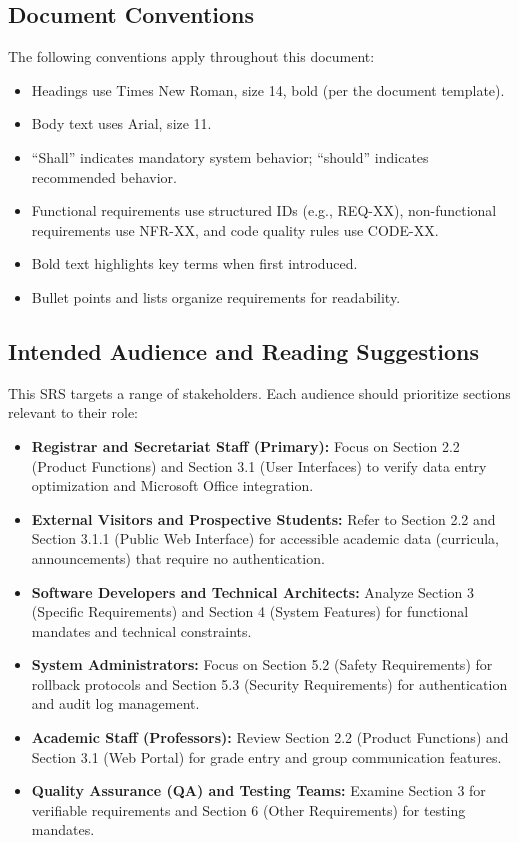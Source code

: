 \documentclass[11pt, a4paper]{article}
\begin{document}
\subsection{Document Conventions}
The following conventions apply throughout this document:
\begin{itemize}
    \item Headings use Times New Roman, size 14, bold (per the document template).
    \item Body text uses Arial, size 11.
    \item ``Shall'' indicates mandatory system behavior; ``should'' indicates recommended behavior.
    \item Functional requirements use structured IDs (e.g., REQ-XX), non-functional requirements use NFR-XX, and code quality rules use CODE-XX.
    \item Bold text highlights key terms when first introduced.
    \item Bullet points and lists organize requirements for readability.
\end{itemize}

\subsection{Intended Audience and Reading Suggestions}
This SRS targets a range of stakeholders. Each audience should prioritize sections relevant to their role:
\begin{itemize}
    \item \textbf{Registrar and Secretariat Staff (Primary):} Focus on Section 2.2 (Product Functions) and Section 3.1 (User Interfaces) to verify data entry optimization and Microsoft Office integration.
    \item \textbf{External Visitors and Prospective Students:} Refer to Section 2.2 and Section 3.1.1 (Public Web Interface) for accessible academic data (curricula, announcements) that require no authentication.
    \item \textbf{Software Developers and Technical Architects:} Analyze Section 3 (Specific Requirements) and Section 4 (System Features) for functional mandates and technical constraints.
    \item \textbf{System Administrators:} Focus on Section 5.2 (Safety Requirements) for rollback protocols and Section 5.3 (Security Requirements) for authentication and audit log management.
    \item \textbf{Academic Staff (Professors):} Review Section 2.2 (Product Functions) and Section 3.1 (Web Portal) for grade entry and group communication features.
    \item \textbf{Quality Assurance (QA) and Testing Teams:} Examine Section 3 for verifiable requirements and Section 6 (Other Requirements) for testing mandates.
\end{itemize}
\end{document}
